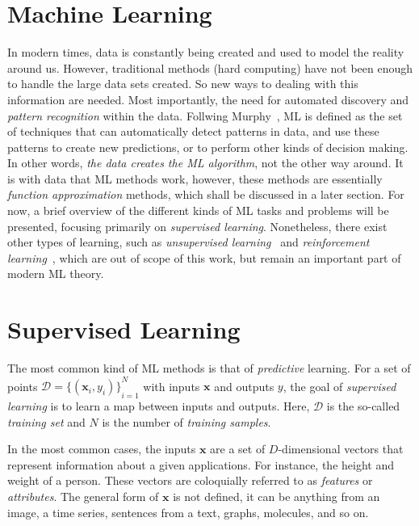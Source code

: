 \section{Machine Learning}
In modern times, data is constantly being created and used to model the reality around us.
However, traditional methods (hard computing) have not been enough to handle the large
data sets created. So new ways to dealing with this information are needed. Most 
importantly, the need for automated discovery and \emph{pattern recognition} within the
data. Follwing Murphy~\cite{murphyMachineLearningProbabilistic2012}, ML is defined
as the set of techniques that can automatically detect patterns in data, and use these
patterns to create new predictions, or to perform other kinds of decision making.
In other words, \emph{the data creates the ML algorithm}, not the other way around.
It is with data that ML methods work, however, these methods are essentially
\emph{function approximation} methods, which shall be discussed in a later section.
For now, a brief overview of the different kinds of ML tasks and problems will be presented,
focusing primarily on \emph{supervised learning}. Nonetheless, there exist other types
of learning, such as \emph{unsupervised learning}~\cite{goodfellowDeepLearning2016,hastieElementsStatisticalLearning2009} and \emph{reinforcement learning}~\cite{suttonReinforcementLearningSecond2018,kaelblingReinforcementLearningSurvey1996},
which are out of scope of this work, but remain an important part of modern ML theory.

\section{Supervised Learning}
The most common kind of ML methods is that of \emph{predictive} learning. For a set of
points $\mathcal{D}={ \{(\mathbf{x}_{i}, y_i)\} }_{i=1}^{N}$ with inputs $\mathbf{x}$
and outputs $y$, the goal of \emph{supervised learning} is to learn a map between
inputs and outputs. Here, $\mathcal{D}$ is the so-called \emph{training set} and $N$
is the number of \emph{training samples}.

In the most common cases, the inputs $\mathbf{x}$ are a set of $D$-dimensional vectors that
represent information about a given applications. For instance, the height and weight of a
person. These vectors are coloquially referred to as \emph{features} or \emph{attributes}.
The general form of $\mathbf{x}$ is not defined, it can be anything from an image, a time 
series, sentences from a text, graphs, molecules, and so on.

